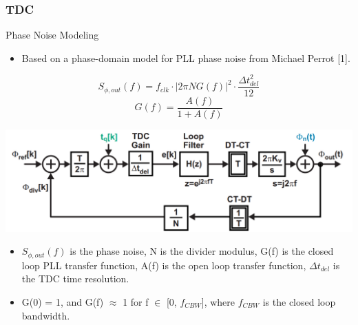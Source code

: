 \documentclass[t, screen, aspectratio=43]{beamer}
\begin{document}
\begin{frame}
	\frametitle{TDC}
	\begin{block}{Phase Noise Modeling}
 		\begin{itemize}
			\scriptsize
			\item Based on a phase-domain model for PLL phase noise from Michael Perrot [1].

		\end{itemize}  

		\begin{minipage}{5cm}
			\tiny
			\begin{equation}
				S_{\phi,out}(f)= f_{clk}\cdot\left| 2\pi NG(f) \right|^2\cdot\frac{\Delta t_{del}^2}{12}
			\end{equation}
			\begin{equation}
				G(f)= \frac{A(f)}{1 + A(f)}
			\end{equation}
		\end{minipage}
		\begin{minipage}{6cm}
			\center\includegraphics[width=1\textwidth, angle=0]{pll_loop.png}
		\end{minipage}
 		\begin{itemize}
			\scriptsize
			\item $S_{\phi,out}(f)$ is the phase noise, N is the divider modulus, G(f) is the closed loop PLL transfer function, A(f) is the open loop transfer function, $\Delta t_{del}$ is the TDC time resolution.
			\item G(0) = 1, and G(f) $\approx$ 1 for f $\in$ [0, $f_{CBW}$], where $f_{CBW}$ is the closed loop bandwidth.

		\end{itemize}  
	\end{block}
\end{frame}
\end{document}

